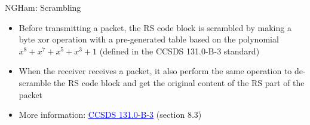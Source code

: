 \begin{frame}{NGHam: Scrambling}
    
    \begin{itemize}
        \item Before transmitting a packet, the RS code block is scrambled by making a byte xor operation with a pre-generated table based on the polynomial $x^{8} + x^{7} + x^{5} + x^{3} + 1$ (defined in the CCSDS 131.0-B-3 standard)
        \vspace{0.5cm}
        \item When the receiver receives a packet, it also perform the same operation to de-scramble the RS code block and get the original content of the RS part of the packet
        \vspace{0.5cm}
        \item More information: \href{https://public.ccsds.org/Pubs/132x0b3.pdf}{\textcolor{blue}{\underline{CCSDS 131.0-B-3}}} (section 8.3)
    \end{itemize}

\end{frame}